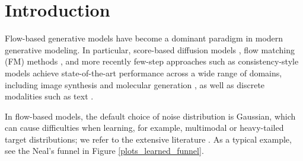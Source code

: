 \documentclass{article}
\theoremstyle{plain}
\theoremstyle{definition}
\theoremstyle{remark}
\begin{document}
\printAffiliationsAndNotice{}  %

\begin{abstract}
The default Gaussian latent in flow-based generative models poses challenges when learning certain distributions such as heavy-tailed ones.
We introduce a general framework for learning data-adaptive parametric prior distributions (latent noise) using one-dimensional quantile functions, optimized via the Wasserstein distance between noise and data. The quantile-based prior parameterization naturally adapts to both heavy-tailed and compactly supported distributions and shortens transport paths. Numerical results on heavy-tailed weather and image datasets confirm the method’s flexibility and effectiveness achieved with negligible computational overhead.
\end{abstract}
%
\section{Introduction}\label{sec:intro}
%

Flow-based generative models have become a dominant paradigm in modern generative modeling. In particular, score-based diffusion models \cite{pmlr-v37-sohl-dickstein15, SE2019, song2021scorebasedgenerativemodelingstochastic}, flow matching (FM) methods \cite{albergo2023stochastic, lipman2023flow, liu2022rectified}, and more recently few-step approaches such as consistency-style models \cite{consistency_song, geng2025meanflowsonestepgenerative, boffi2025buildconsistencymodellearning} achieve state-of-the-art performance across a wide range of domains, including image synthesis and molecular generation \cite{hoogeboom2022equivariantdiffusionmoleculegeneration}, as well as discrete modalities such as  text \cite{austin2023structureddenoisingdiffusionmodels}.

In flow-based models, the default choice of noise distribution is Gaussian, which can cause difficulties when learning, for example, multimodal or heavy-tailed target distributions; we refer to the extensive literature \cite{wiese2019copula, HN2021, SBDD2022, pandey2024heavytaileddiffusionmodels, ghane2025concentration, tam2025statistical}.
 As a typical example, see the Neal's funnel in Figure \ref{plots_learned_funnel}.
\end{document}
